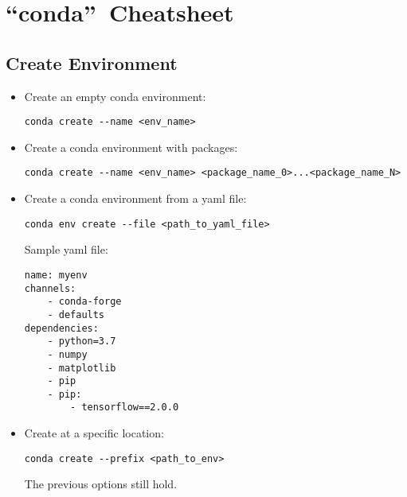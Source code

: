 \section{\textquotedblleft conda\textquotedblright\ Cheatsheet}


\subsection{Create Environment}

\begin{itemize}
    \item Create an empty conda environment:
    \begin{verbatim}
conda create --name <env_name>
    \end{verbatim}
    \item Create a conda environment with packages:
    \begin{verbatim}
conda create --name <env_name> <package_name_0>...<package_name_N>
    \end{verbatim}
    \item Create a conda environment from a yaml file:
    \begin{verbatim}
conda env create --file <path_to_yaml_file>
    \end{verbatim}
    Sample yaml file:
    \begin{verbatim}
name: myenv
channels:
    - conda-forge
    - defaults
dependencies:
    - python=3.7
    - numpy
    - matplotlib
    - pip
    - pip:
        - tensorflow==2.0.0
    \end{verbatim}
    \item Create at a specific location:
    \begin{verbatim}
conda create --prefix <path_to_env>
    \end{verbatim}
    The previous options still hold.
\end{itemize}


